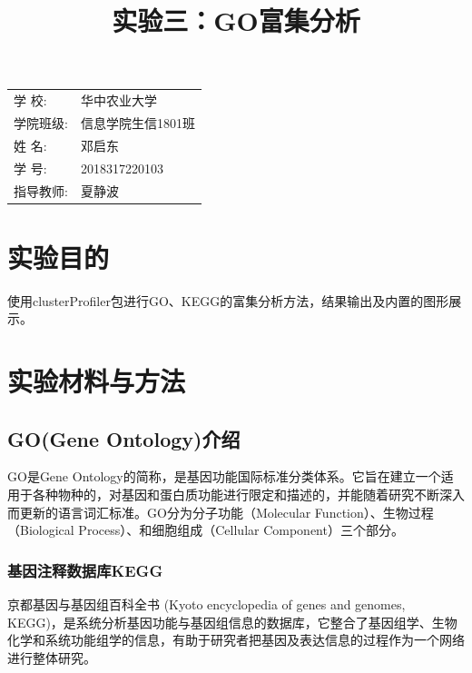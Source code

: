 \documentclass{article}
\title{\heiti 实验三：GO富集分析}
\begin{document}
	\maketitle
	
	\vspace{5cm}
	
	\begin{table}[h]
		\centering
		\begin{Large}
			\begin{tabular}{p{3cm} p{7cm}<{\centering}}
				学  \qquad  校: &  华中农业大学     \\ \cline{2-2}
				学院班级:      & 信息学院生信1801班   \\ \cline{2-2}
				姓  \qquad  名: & 邓启东 \\ \cline{2-2}
				学  \qquad  号: & 2018317220103 \\ \cline{2-2}
				指导教师:       &夏静波 \\ \cline{2-2}
			\end{tabular}
		\end{Large}		
	\end{table}
	
	\newpage%

	\tableofcontents
	
	\newpage
\section{实验目的}
使用clusterProfiler包进行GO、KEGG的富集分析方法，结果输出及内置的图形展示。
\section{实验材料与方法}
\subsection{GO(Gene Ontology)介绍}
GO是Gene Ontology的简称，是基因功能国际标准分类体系。它旨在建立一个适用于各种物种的，对基因和蛋白质功能进行限定和描述的，并能随着研究不断深入而更新的语言词汇标准。GO分为分子功能（Molecular Function）、生物过程（Biological Process）、和细胞组成（Cellular Component）三个部分。
\subsubsection{基因注释数据库KEGG}
京都基因与基因组百科全书 (Kyoto encyclopedia of genes and genomes, KEGG)，是系统分析基因功能与基因组信息的数据库，它整合了基因组学、生物化学和系统功能组学的信息，有助于研究者把基因及表达信息的过程作为一个网络进行整体研究。
\end{document}
